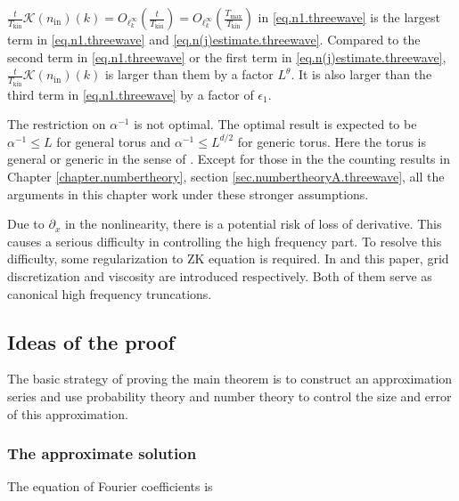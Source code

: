 \begin{rem}
$\frac{t}{T_{\mathrm{kin}}}\mathcal K(n_{\mathrm{in}})(k)=O_{\ell^\infty_k}\left(\frac{t}{T_{\mathrm{kin}}}\right)=O_{\ell^\infty_k}\left(\frac{T_{\mathrm{max}}}{T_{\mathrm{kin}}}\right)$ in \eqref{eq.n1.threewave} is the largest term in \eqref{eq.n1.threewave} and \eqref{eq.n(j)estimate.threewave}. Compared to the second term in \eqref{eq.n1.threewave} or the first term in \eqref{eq.n(j)estimate.threewave}, $\frac{t}{T_{\mathrm{kin}}}\mathcal K(n_{\mathrm{in}})(k)$ is larger than them by a factor $L^{\theta}$.  It is also larger than the third term in \eqref{eq.n1.threewave} by a factor of $\epsilon_1$.
\end{rem}

\begin{rem}
The restriction on $\alpha^{-1}$ is not optimal. The optimal result is expected to be $\alpha^{-1}\le L$ for general torus and $\alpha^{-1}\le L^{d/2}$ for generic torus. Here the torus is general or generic in the sense of \cite{deng2021derivation}. Except for those in the the counting results in Chapter \ref{chapter.numbertheory}, section \ref{sec.numbertheoryA.threewave}, all the arguments in this chapter work under these stronger assumptions.
\end{rem}

\begin{rem}
Due to $\partial_x$ in the nonlinearity, there is a potential risk of loss of derivative. This causes a serious difficulty in controlling the high frequency part. To resolve this difficulty, some regularization to ZK equation is required. In \cite{staffilani2021wave} and this paper, grid discretization and viscosity are introduced respectively. Both of them serve as canonical high frequency truncations.
\end{rem}




 





\subsection{Ideas of the proof} The basic strategy of proving the main theorem is to construct an approximation series and use probability theory and number theory to control the size and error of this approximation.


\subsubsection{The approximate solution}\label{sec.appsol} The equation of Fourier coefficients is

